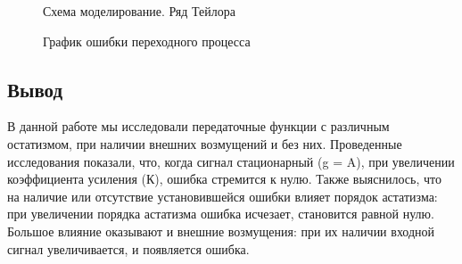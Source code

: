 \documentclass[a4paper, 11pt]{article}
\begin{document}
\newpage 

\begin{figure}[h!]
    \caption{Схема моделирование. Ряд Тейлора}
    \label{tree}
\end{figure}

\begin{figure}[h]
    \caption{График ошибки переходного процесса}
    \label{tree}
\end{figure}
\newpage
\begin{center}
\section*{Вывод}
\end{center}
 В данной работе мы исследовали передаточные функции с различным остатизмом, при наличии внешних возмущений и без них. Проведенные исследования показали, что, когда сигнал стационарный (g = A), при увеличении коэффициента усиления (К), ошибка стремится к нулю. Также выяснилось, что на наличие или отсутствие установившейся ошибки влияет порядок астатизма: при увеличении порядка астатизма ошибка исчезает, становится равной нулю. Большое влияние оказывают и внешние возмущения: при их наличии входной сигнал увеличивается, и появляется ошибка.
\end{document}
